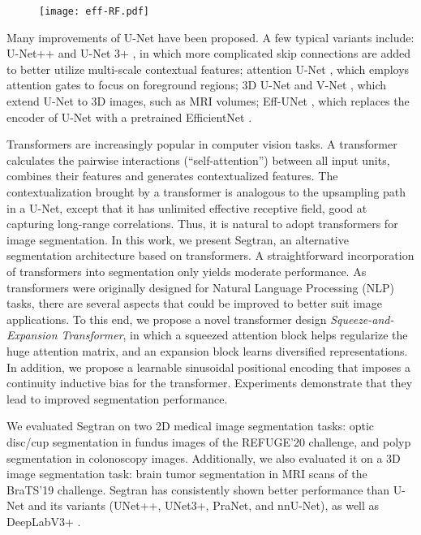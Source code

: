 \documentclass{article}
\begin{document}
\begin{figure}[t]
\centering
  \texttt{[image: eff-RF.pdf]}
  \label{fig:eff-RF}
\end{figure}


Many improvements of U-Net have been proposed. A few typical variants include: U-Net++ \cite{unet++} and U-Net 3+ \cite{unet3+}, in which more complicated skip connections are added to better utilize multi-scale contextual features; attention U-Net \cite{attention-unet-journal}, which employs attention gates to focus on foreground regions; 3D U-Net \cite{3d-unet} and V-Net \cite{vnet}, which extend U-Net to 3D images, such as MRI volumes; Eff-UNet \cite{eff-unet}, which replaces the encoder of U-Net with a pretrained EfficientNet \cite{efficientnet}.

Transformers \cite{transformer} are increasingly popular in computer vision tasks. A transformer calculates the pairwise interactions (``self-attention'') between all input units, combines their features and generates contextualized features. The contextualization brought by a transformer is analogous to the upsampling path in a U-Net, except that it has unlimited effective receptive field, good at capturing long-range correlations. 
Thus, it is natural to adopt transformers for image segmentation. In this work, we present Segtran, an alternative segmentation architecture based on transformers. A straightforward incorporation of transformers into segmentation only yields moderate performance. As transformers were originally designed for Natural Language Processing (NLP) tasks, there are several aspects that could be improved to better suit image applications. To this end, we propose a novel transformer design \emph{Squeeze-and-Expansion Transformer}, in which a squeezed attention block helps regularize the huge attention matrix, and an expansion block learns diversified representations. In addition, we propose a  learnable sinusoidal positional encoding that imposes a continuity inductive bias for the transformer. Experiments demonstrate that they lead to improved segmentation performance.



We evaluated Segtran on two 2D medical image segmentation tasks: optic disc/cup segmentation in fundus images of the REFUGE'20 challenge, and polyp segmentation in colonoscopy images. Additionally, we also evaluated it on a 3D image segmentation task:  brain tumor segmentation in MRI scans of the BraTS'19 challenge. Segtran has consistently shown better performance than U-Net and its variants (UNet++, UNet3+, PraNet, and nnU-Net), as well as DeepLabV3+ \cite{deeplabv3+}. 
\end{document}
